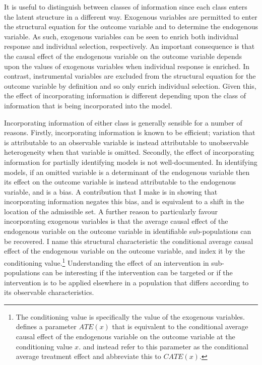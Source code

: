 \documentclass[10pt,a4paper,twoside]{article}
\numberwithin{equation}{section}
\begin{document}
It is useful to distinguish between classes of information since each class enters the latent structure in a different way. Exogenous variables are permitted to enter the structural equation for the outcome variable and to determine the endogenous variable. As such, exogenous variables can be seen to enrich both individual response and individual selection, respectively. An important consequence is that the causal effect of the endogenous variable on the outcome variable depends upon the values of exogenous variables when individual response is enriched. In contrast, instrumental variables are excluded from the structural equation for the outcome variable by definition and so only enrich individual selection. Given this, the effect of incorporating information is different depending upon the class of information that is being incorporated into the model.  

Incorporating information of either class is generally sensible for a number of reasons. Firstly, incorporating information is known to be efficient; variation that is attributable to an observable variable is instead attributable to unobservable heterogeneity when that variable is omitted. Secondly, the effect of incorporating information for partially identifying models is not well-documented. In identifying models, if an omitted variable is a determinant of the endogenous variable then its effect on the outcome variable is instead attributable to the endogenous variable, and is a bias. A contribution that I make is in showing that incorporating information negates this bias, and is equivalent to a shift in the location of the admissible set. A further reason to particularly favour incorporating exogenous variables is that the average causal effect of the endogenous variable on the outcome variable in identifiable sub-populations can be recovered. I name this structural characteristic the conditional average causal effect of the endogenous variable on the outcome variable, and index it by the conditioning value.\footnote{The conditioning value is specifically the value of the exogenous variables. \cite{hEvY05} defines a parameter $ATE(x)$ that is equivalent to the conditional average causal effect of the endogenous variable on the outcome variable at the conditioning value $x$. \cite{kHt10} and \cite{13.misc.abrevaya} instead refer to this parameter as the conditional average treatment effect and abbreviate this to $CATE(x)$.} Understanding the effect of an intervention in sub-populations can be interesting if the intervention can be targeted or if the intervention is to be applied elsewhere in a population that differs according to its observable characteristics. 
\end{document}
